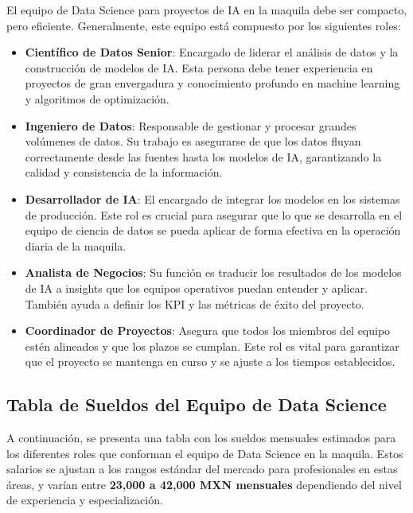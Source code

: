 El equipo de Data Science para proyectos de IA en la maquila debe ser compacto, pero eficiente. Generalmente, este equipo está compuesto por los siguientes roles:

\begin{itemize}
    \item \textbf{Científico de Datos Senior}: Encargado de liderar el análisis de datos y la construcción de modelos de IA. Esta persona debe tener experiencia en proyectos de gran envergadura y conocimiento profundo en machine learning y algoritmos de optimización.
    \item \textbf{Ingeniero de Datos}: Responsable de gestionar y procesar grandes volúmenes de datos. Su trabajo es asegurarse de que los datos fluyan correctamente desde las fuentes hasta los modelos de IA, garantizando la calidad y consistencia de la información.
    \item \textbf{Desarrollador de IA}: El encargado de integrar los modelos en los sistemas de producción. Este rol es crucial para asegurar que lo que se desarrolla en el equipo de ciencia de datos se pueda aplicar de forma efectiva en la operación diaria de la maquila.
    \item \textbf{Analista de Negocios}: Su función es traducir los resultados de los modelos de IA a insights que los equipos operativos puedan entender y aplicar. También ayuda a definir los KPI y las métricas de éxito del proyecto.
    \item \textbf{Coordinador de Proyectos}: Asegura que todos los miembros del equipo estén alineados y que los plazos se cumplan. Este rol es vital para garantizar que el proyecto se mantenga en curso y se ajuste a los tiempos establecidos.
\end{itemize}

\subsection{Tabla de Sueldos del Equipo de Data Science}

A continuación, se presenta una tabla con los sueldos mensuales estimados para los diferentes roles que conforman el equipo de Data Science en la maquila. Estos salarios se ajustan a los rangos estándar del mercado para profesionales en estas áreas, y varían entre \textbf{23,000 a 42,000 MXN mensuales} dependiendo del nivel de experiencia y especialización.


